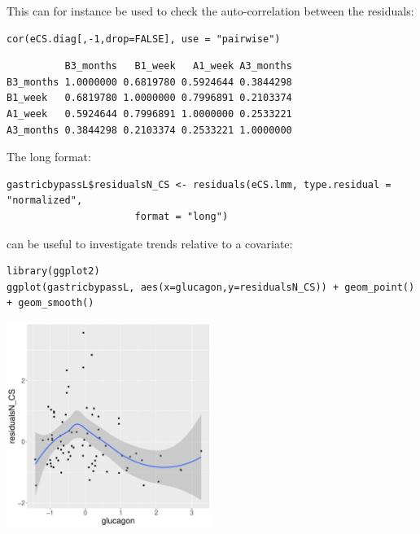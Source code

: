 \documentclass[12pt]{article}
\begin{document}
This can for instance be used to check the auto-correlation between the residuals:
\lstset{language=r,label= ,caption= ,captionpos=b,numbers=none}
\begin{lstlisting}
cor(eCS.diag[,-1,drop=FALSE], use = "pairwise")
\end{lstlisting}
\begin{verbatim}
          B3_months   B1_week   A1_week A3_months
B3_months 1.0000000 0.6819780 0.5924644 0.3844298
B1_week   0.6819780 1.0000000 0.7996891 0.2103374
A1_week   0.5924644 0.7996891 1.0000000 0.2533221
A3_months 0.3844298 0.2103374 0.2533221 1.0000000
\end{verbatim}


The long format:
\lstset{language=r,label= ,caption= ,captionpos=b,numbers=none}
\begin{lstlisting}
gastricbypassL$residualsN_CS <- residuals(eCS.lmm, type.residual = "normalized",
					  format = "long")
\end{lstlisting}

can be useful to investigate trends relative to a covariate:
\lstset{language=r,label= ,caption= ,captionpos=b,numbers=none}
\begin{lstlisting}
library(ggplot2)
ggplot(gastricbypassL, aes(x=glucagon,y=residualsN_CS)) + geom_point() + geom_smooth()
\end{lstlisting}

\begin{center}
\includegraphics[width=0.5\textwidth]{./figures/diag-cov.pdf}
\end{center}

\clearpage
\end{document}
